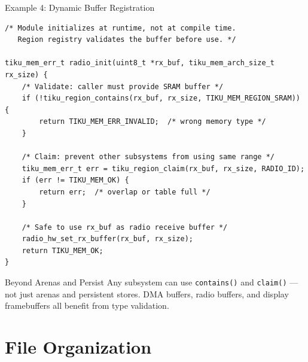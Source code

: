 \documentclass[aspectratio=169, 10pt]{beamer}
\begin{document}
\begin{frame}[fragile]{Example 4: Dynamic Buffer Registration}
\begin{lstlisting}[style=cstyle]
/* Module initializes at runtime, not at compile time.
   Region registry validates the buffer before use. */

tiku_mem_err_t radio_init(uint8_t *rx_buf, tiku_mem_arch_size_t rx_size) {
    /* Validate: caller must provide SRAM buffer */
    if (!tiku_region_contains(rx_buf, rx_size, TIKU_MEM_REGION_SRAM)) {
        return TIKU_MEM_ERR_INVALID;  /* wrong memory type */
    }

    /* Claim: prevent other subsystems from using same range */
    tiku_mem_err_t err = tiku_region_claim(rx_buf, rx_size, RADIO_ID);
    if (err != TIKU_MEM_OK) {
        return err;  /* overlap or table full */
    }

    /* Safe to use rx_buf as radio receive buffer */
    radio_hw_set_rx_buffer(rx_buf, rx_size);
    return TIKU_MEM_OK;
}
\end{lstlisting}

\begin{alertblock}{Beyond Arenas and Persist}
Any subsystem can use \texttt{contains()} and \texttt{claim()} ---
not just arenas and persistent stores.  DMA buffers, radio buffers,
and display framebuffers all benefit from type validation.
\end{alertblock}
\end{frame}

\section{File Organization}
\end{document}
